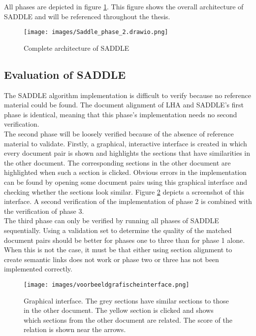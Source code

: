 All phases are depicted in figure \ref{imgsadllearch}. This figure shows the overall architecture of SADDLE and will be referenced throughout the thesis.\\

\begin{figure}[h]
\centering
\captionsetup{justification=centering}

\texttt{[image: images/Saddle\_phase\_2.drawio.png]}
\caption{Complete architecture of SADDLE}
\label{imgsadllearch}
\end{figure}



\subsection{Evaluation of SADDLE}
\label{secSADDLEVerification}

The SADDLE algorithm implementation is difficult to verify because no reference material could be found. The document alignment of LHA and SADDLE's first phase is identical, meaning that this phase's implementation needs no second verification.\\

The second phase will be loosely verified because of the absence of reference material to validate. Firstly, a graphical, interactive interface is created in which every document pair is shown and highlights the sections that have similarities in the other document. The corresponding sections in the other document are highlighted when such a section is clicked. Obvious errors in the implementation can be found by opening some document pairs using this graphical interface and checking whether the sections look similar. Figure \ref{imggrafischeinterface} depicts a screenshot of this interface. A second verification of the implementation of phase 2 is combined with the verification of phase 3.\\

The third phase can only be verified by running all phases of SADDLE sequentially. Using a validation set to determine the quality of the matched document pairs should be better for phases one to three than for phase 1 alone. When this is not the case, it must be that either using section
alignment to create semantic links does not work or phase two or three has not been implemented correctly.\\

\begin{figure}[h]
\centering
\captionsetup{justification=centering}

\texttt{[image: images/voorbeeldgrafischeinterface.png]}
\caption{Graphical interface. The grey sections have similar sections to those in the other document. The yellow section is clicked and shows which sections from the other document are related. The score of the relation is shown near the arrows.}
\label{imggrafischeinterface}
\end{figure}

